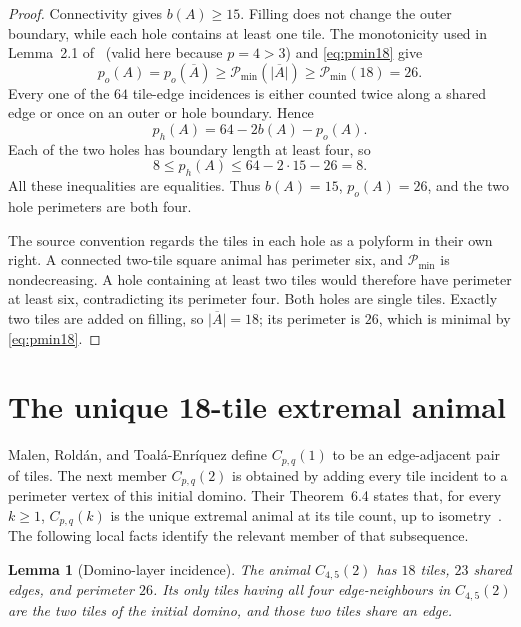 \documentclass[11pt]{article}
\newtheorem{lemma}[theorem]{Lemma}
\begin{document}
\begin{proof}
Connectivity gives $b(A)\ge15$.  Filling does not change the outer
boundary, while each hole contains at least one tile.  The monotonicity used
in Lemma~2.1 of~\cite{EldridgeEtAl2026} (valid here because $p=4>3$) and
\eqref{eq:pmin18} give
\[
 p_o(A)=p_o(\overline A)
   \ge \mathcal P_{\min}(\lvert\overline A\rvert)
   \ge \mathcal P_{\min}(18)=26.
\]
Every one of the $64$ tile-edge incidences is either counted twice along a
shared edge or once on an outer or hole boundary.  Hence
\[
                  p_h(A)=64-2b(A)-p_o(A).
\]
Each of the two holes has boundary length at least four, so
\[
 8\le p_h(A)\le64-2\cdot15-26=8.
\]
All these inequalities are equalities.  Thus $b(A)=15$, $p_o(A)=26$, and
the two hole perimeters are both four.

The source convention regards the tiles in each hole as a polyform in their
own right.  A connected two-tile square animal has perimeter six, and
   $\mathcal P_{\min}$ is nondecreasing.  A hole containing at least two tiles would
therefore have perimeter at least six, contradicting its perimeter four.
Both holes are single tiles.  Exactly two tiles are added on filling, so
$\lvert\overline A\rvert=18$; its perimeter is $26$, which is minimal by
\eqref{eq:pmin18}.
\end{proof}

\section{The unique 18-tile extremal animal}

Malen, Rold\'an, and Toal\'a-Enr\'iquez define $C_{p,q}(1)$ to be an
edge-adjacent pair of tiles.  The next member $C_{p,q}(2)$ is obtained by
adding every tile incident to a perimeter vertex of this initial domino.
Their Theorem~6.4 states that, for every $k\ge1$, $C_{p,q}(k)$ is the unique
extremal animal at its tile count, up to isometry~\cite{MalenRoldanToala2023}.
The following local facts identify the relevant member of that subsequence.

\begin{lemma}[Domino-layer incidence]\label{lem:incidence}
The animal $C_{4,5}(2)$ has $18$ tiles, $23$ shared edges, and perimeter
$26$.  Its only tiles having all four edge-neighbours in $C_{4,5}(2)$ are
the two tiles of the initial domino, and those two tiles share an edge.
\end{lemma}
\end{document}
